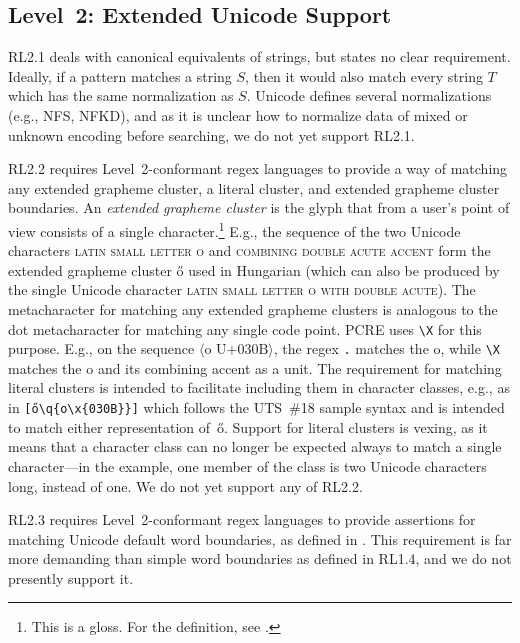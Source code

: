 \documentclass[5p,final,number,sort&compress]{elsarticle}
\newcommand{\re}[1]{\texttt{#1}}
\newcommand*{\whack}{\textbackslash}
\begin{document}
\subsection{Level~2: Extended Unicode Support}

RL2.1 deals with canonical equivalents of strings, but states no clear requirement. Ideally, if a pattern matches a string $S$, then it would also match every string $T$ which has the same normalization as $S$. Unicode defines several normalizations (e.g., NFS, NFKD), and as it is unclear how to normalize data of mixed or unknown encoding before searching, we do not yet support RL2.1.

RL2.2 requires Level~2-conformant regex languages to provide a way of matching any extended grapheme cluster, a literal cluster, and extended grapheme cluster boundaries. An \emph{extended grapheme cluster} is the glyph that from a user's point of view consists of a single character.\footnote{This is a gloss. For the definition, see \citep[\S 3]{uax29}.} E.g., the sequence of the two Unicode characters \textsc{latin small letter o} and \textsc{combining double acute accent} form the extended grapheme cluster \H{o} used in Hungarian (which can also be produced by the single Unicode character \textsc{latin small letter o with double acute}). The metacharacter for matching any extended grapheme clusters is analogous to the dot metacharacter for matching any single code point. PCRE uses \re{\whack X} for this purpose. E.g., on the sequence $\langle \text{o U+030B} \rangle$, the regex \re{.} matches the o, while \re{\whack X} matches the o and its combining accent as a unit. The requirement for matching literal clusters is intended to facilitate including them in character classes, e.g., as in \re{[\H{o}\whack q\{o\whack x\{030B\}\}]} which follows the UTS~\#18 sample syntax and is intended to match either representation of~\H{o}. Support for literal clusters is vexing, as it means that a character class can no longer be expected always to match a single character---in the example, one member of the class is two Unicode characters long, instead of one. We do not yet support any of RL2.2.

RL2.3 requires Level~2-conformant regex languages to provide assertions for matching Unicode default word boundaries, as defined in \citep[\S 4]{uax29}. This requirement is far more demanding than simple word boundaries as defined in RL1.4, and we do not presently support it.
\end{document}
